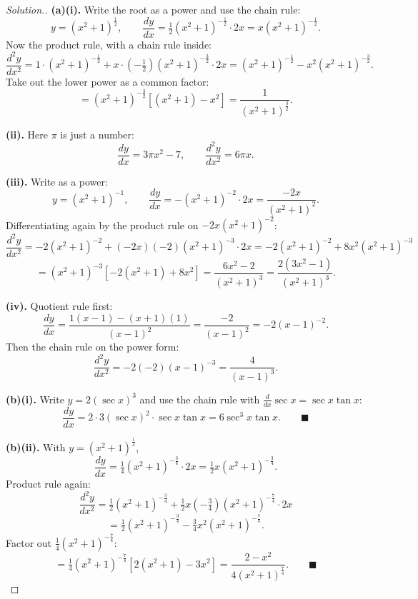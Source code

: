 \documentclass[11pt,a4paper]{article}
\theoremstyle{definition}
\newenvironment{solution}
  {\renewcommand{\qedsymbol}{}\begin{proof}[\textit{Solution}.]}
  {\end{proof}}
\begin{document}
\begin{solution}
\textbf{(a)(i).} Write the root as a power and use the chain rule:
$$y=\left(x^2+1\right)^{\frac{1}{2}},\qquad
\frac{dy}{dx}=\tfrac{1}{2}\left(x^2+1\right)^{-\frac{1}{2}}\cdot 2x
=x\left(x^2+1\right)^{-\frac{1}{2}}.$$
Now the product rule, with a chain rule inside:
$$\frac{d^2y}{dx^2}=1\cdot\left(x^2+1\right)^{-\frac{1}{2}}
+x\cdot\left(-\tfrac{1}{2}\right)\left(x^2+1\right)^{-\frac{3}{2}}\cdot 2x
=\left(x^2+1\right)^{-\frac{1}{2}}-x^2\left(x^2+1\right)^{-\frac{3}{2}}.$$
Take out the lower power as a common factor:
$$=\left(x^2+1\right)^{-\frac{3}{2}}\left[\left(x^2+1\right)-x^2\right]
=\frac{1}{\left(x^2+1\right)^{\frac{3}{2}}}.$$

\textbf{(ii).} Here $\pi$ is just a number:
$$\frac{dy}{dx}=3\pi x^2-7,\qquad \frac{d^2y}{dx^2}=6\pi x.$$

\textbf{(iii).} Write as a power:
$$y=\left(x^2+1\right)^{-1},\qquad
\frac{dy}{dx}=-\left(x^2+1\right)^{-2}\cdot 2x=\frac{-2x}{\left(x^2+1\right)^2}.$$
Differentiating again by the product rule on $-2x\left(x^2+1\right)^{-2}$:
$$\frac{d^2y}{dx^2}=-2\left(x^2+1\right)^{-2}
+(-2x)(-2)\left(x^2+1\right)^{-3}\cdot 2x
=-2\left(x^2+1\right)^{-2}+8x^2\left(x^2+1\right)^{-3}$$
$$=\left(x^2+1\right)^{-3}\left[-2\left(x^2+1\right)+8x^2\right]
=\frac{6x^2-2}{\left(x^2+1\right)^3}=\frac{2\left(3x^2-1\right)}{\left(x^2+1\right)^3}.$$

\textbf{(iv).} Quotient rule first:
$$\frac{dy}{dx}=\frac{1(x-1)-(x+1)(1)}{(x-1)^2}=\frac{-2}{(x-1)^2}=-2(x-1)^{-2}.$$
Then the chain rule on the power form:
$$\frac{d^2y}{dx^2}=-2(-2)(x-1)^{-3}=\frac{4}{(x-1)^3}.$$

\textbf{(b)(i).} Write $y=2\left(\sec x\right)^3$ and use the chain rule with
$\frac{d}{dx}\sec x=\sec x\tan x$:
$$\frac{dy}{dx}=2\cdot 3\left(\sec x\right)^2\cdot\sec x\tan x
=6\sec^3x\tan x.\qquad\blacksquare$$

\textbf{(b)(ii).} With $y=\left(x^2+1\right)^{\frac{1}{4}}$,
$$\frac{dy}{dx}=\tfrac{1}{4}\left(x^2+1\right)^{-\frac{3}{4}}\cdot 2x
=\tfrac{1}{2}x\left(x^2+1\right)^{-\frac{3}{4}}.$$
Product rule again:
$$\frac{d^2y}{dx^2}=\tfrac{1}{2}\left(x^2+1\right)^{-\frac{3}{4}}
+\tfrac{1}{2}x\left(-\tfrac{3}{4}\right)\left(x^2+1\right)^{-\frac{7}{4}}\cdot 2x$$
$$=\tfrac{1}{2}\left(x^2+1\right)^{-\frac{3}{4}}
-\tfrac{3}{4}x^2\left(x^2+1\right)^{-\frac{7}{4}}.$$
Factor out $\frac{1}{4}\left(x^2+1\right)^{-\frac{7}{4}}$:
$$=\tfrac{1}{4}\left(x^2+1\right)^{-\frac{7}{4}}
\left[2\left(x^2+1\right)-3x^2\right]
=\frac{2-x^2}{4\left(x^2+1\right)^{\frac{7}{4}}}.\qquad\blacksquare$$


\end{solution}
\end{document}

